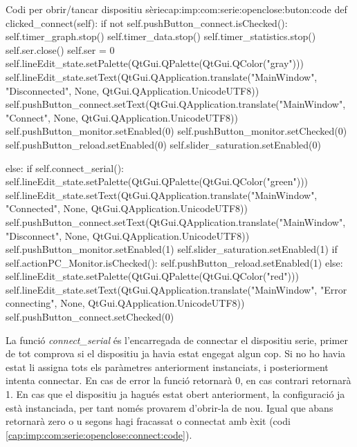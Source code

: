 \begin{code_python}{Codi per obrir/tancar dispositiu sèrie}{cap:imp:com:serie:openclose:buton:code}
def clicked_connect(self):
	if not self.pushButton_connect.isChecked():
		self.timer_graph.stop()
		self.timer_data.stop()
		self.timer_statistics.stop()
		self.ser.close()
		self.ser = 0
		self.lineEdit_state.setPalette(QtGui.QPalette(QtGui.QColor("gray")))
		self.lineEdit_state.setText(QtGui.QApplication.translate("MainWindow", "Disconnected", None, QtGui.QApplication.UnicodeUTF8))
		self.pushButton_connect.setText(QtGui.QApplication.translate("MainWindow", "Connect", None, QtGui.QApplication.UnicodeUTF8))
		self.pushButton_monitor.setEnabled(0)
		self.pushButton_monitor.setChecked(0)
		self.pushButton_reload.setEnabled(0)
		self.slider_saturation.setEnabled(0)
		
	else:
		if self.connect_serial():
		    self.lineEdit_state.setPalette(QtGui.QPalette(QtGui.QColor("green")))
		    self.lineEdit_state.setText(QtGui.QApplication.translate("MainWindow", "Connected", None, QtGui.QApplication.UnicodeUTF8))
		    self.pushButton_connect.setText(QtGui.QApplication.translate("MainWindow", "Disconnect", None, QtGui.QApplication.UnicodeUTF8))
		    self.pushButton_monitor.setEnabled(1)
		    self.slider_saturation.setEnabled(1)
		    if self.actionPC_Monitor.isChecked():
		        self.pushButton_reload.setEnabled(1)
		else:
		    self.lineEdit_state.setPalette(QtGui.QPalette(QtGui.QColor("red")))
		    self.lineEdit_state.setText(QtGui.QApplication.translate("MainWindow", "Error connecting", None, QtGui.QApplication.UnicodeUTF8))
		    self.pushButton_connect.setChecked(0)
\end{code_python}


La funció \emph{connect\_serial} és l'encarregada de connectar el dispositiu serie, primer de tot comprova si el dispositiu ja havia estat engegat algun cop. Si no ho havia estat li assigna tots els paràmetres anteriorment instanciats, i posteriorment intenta connectar. En cas de error la funció retornarà 0, en cas contrari retornarà 1.
En cas que el dispositiu ja hagués estat obert anteriorment, la configuració ja està instanciada, per tant només provarem d'obrir-la de nou. Igual que abans retornarà zero o u segons hagi fracassat o connectat amb èxit (codi \ref{cap:imp:com:serie:openclose:connect:code}).

